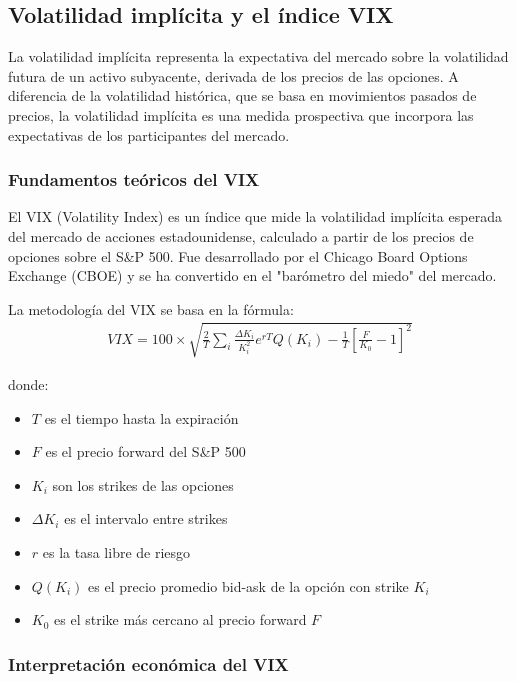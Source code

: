 \subsection{Volatilidad implícita y el índice VIX}

La volatilidad implícita representa la expectativa del mercado sobre la volatilidad futura de un activo subyacente, derivada de los precios de las opciones. A diferencia de la volatilidad histórica, que se basa en movimientos pasados de precios, la volatilidad implícita es una medida prospectiva que incorpora las expectativas de los participantes del mercado.

\subsubsection{Fundamentos teóricos del VIX}

El VIX (Volatility Index) es un índice que mide la volatilidad implícita esperada del mercado de acciones estadounidense, calculado a partir de los precios de opciones sobre el S\&P 500. Fue desarrollado por el Chicago Board Options Exchange (CBOE) y se ha convertido en el "barómetro del miedo" del mercado.

La metodología del VIX se basa en la fórmula:
\begin{align}
    VIX = 100 \times \sqrt{\frac{2}{T} \sum_i \frac{\Delta K_i}{K_i^2} e^{rT} Q(K_i) - \frac{1}{T}\left[\frac{F}{K_0} - 1\right]^2}
\end{align}

donde:
\begin{itemize}
    \item $T$ es el tiempo hasta la expiración
    \item $F$ es el precio forward del S\&P 500
    \item $K_i$ son los strikes de las opciones
    \item $\Delta K_i$ es el intervalo entre strikes
    \item $r$ es la tasa libre de riesgo
    \item $Q(K_i)$ es el precio promedio bid-ask de la opción con strike $K_i$
    \item $K_0$ es el strike más cercano al precio forward $F$
\end{itemize}

\subsubsection{Interpretación económica del VIX}

